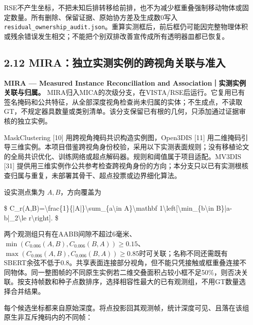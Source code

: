 \documentclass[UTF8,fontset=fandol]{ctexart}
\begin{document}
RSE不产生坐标，不把未知后排转移给前排，也不为减少框重叠强制移动物体或固定数量。所有删除、保留证据、原始协方差及生成数0写入\texttt{residual\_\allowbreak{}ownership\_\allowbreak{}audit.\allowbreak{}json}。重算实测框后，前后框仍可能因完整物理体积或残余错误发生相交；不能把个别双排改善宣传成所有透明器皿都已恢复。



\subsection*{2.12 MIRA：独立实测实例的跨视角关联与准入}

\textbf{MIRA — Measured Instance Reconciliation and Association｜实测实例关联与归属。} MIRA归入MICA的次级分支，在VISTA/RSE后运行。它复用已有签名掩码和公共特征，从全部深度视角检查尚未归属的实体；不生成点，不读取GT，不规定器具数量或类别清单。该分支保留已有根的几何，只添加通过证据审核的独立实例。



MaskClustering [10] 用跨视角掩码共识构造实例图，Open3DIS [11] 用二维掩码引导三维实例。本项目借鉴跨视角身份校验，采用以下实测表面规则；没有移植论文的全局共识优化、训练网络或超点解码器。规则和阈值属于项目适配。MV3DIS [31] 提供用三维实例作公共参考检查跨视角身份的方向；本分支只以已有实测根核查归属与重复，未部署其骨干、超点投票或边界细化算法。



设实测点集为 $A,B$，方向覆盖为



\$
C\_r(A,B)=\textbackslash{}frac\{1\}\{|A|\}\textbackslash{}sum\_\{a\textbackslash{}in A\}\textbackslash{}mathbf 1\textbackslash{}left[\textbackslash{}min\_\{b\textbackslash{}in B\}|a-b|\_2\textbackslash{}le r\textbackslash{}right].
\$



两个观测组只有在AABB间隙不超过6毫米、$\min(C_{0.006}(A,B),C_{0.006}(B,A))\ge0.15$、$\max(C_{0.006}(A,B),C_{0.006}(B,A))\ge0.85$时可关联；名称不同还需既有SBERT余弦不低于0.8。共享表面连接部分视角，但不能只凭接触或框重叠连接不同物体。同一整图帧的不同原生实例若二维交叠面积占较小框不足50\%，则否决关联。按支持帧数和种子点数排序，选择相容性最大的已有观测组，不用GT数量选择合并结果。



每个候选坐标都来自原始深度。将点投影回其观测帧，统计深度可见、且落在该组原生非互斥掩码内的不同帧：
\end{document}
